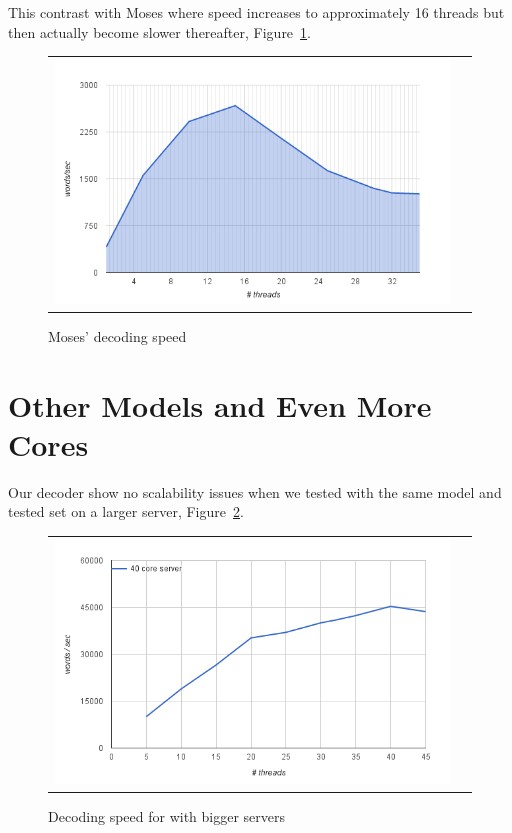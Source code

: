 \documentclass[11pt]{article}
\begin{document}
This contrast with Moses where speed increases to approximately 16 threads but then actually become slower thereafter, Figure~\ref{fig:moses-speed}.
\begin{figure}[h]
\centering
\begin{tabular}{cc}
{\includegraphics[scale=0.4]{moses-scalability.png}} 
\end{tabular}
\caption{Moses' decoding speed}
\label{fig:moses-speed}
\end{figure} 


\section{Other Models and Even More Cores}

Our decoder show no scalability issues when we tested with the same model and tested set on a larger server, Figure~\ref{fig:more-cores}.
\begin{figure}[h]
\centering
\begin{tabular}{cc}
{\includegraphics[scale=0.4]{more-cores.png}} 
\end{tabular}
\caption{Decoding speed for with bigger servers}
\label{fig:more-cores}
\end{figure} 
\end{document}
